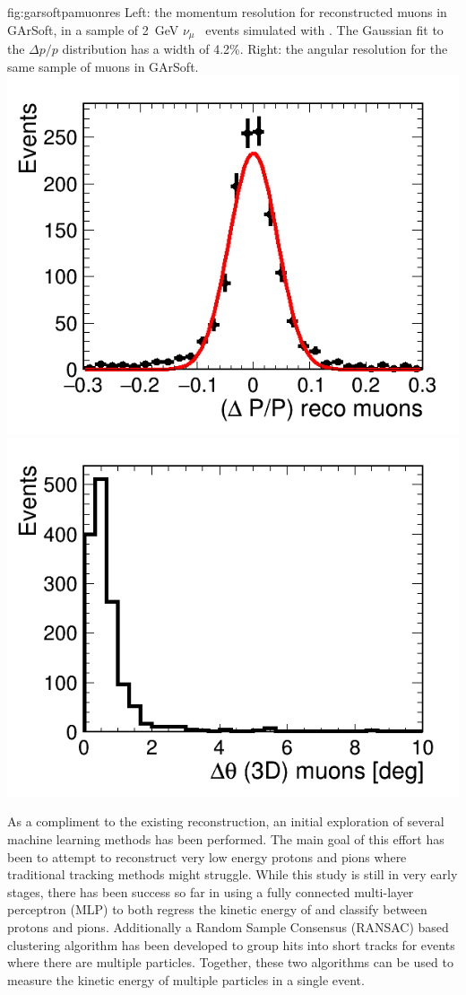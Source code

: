 \begin{dunefigure}{fig:garsoftpamuonres}
{Left: the momentum resolution for reconstructed muons in GArSoft, in a sample of \SI{2}{GeV} $\nu_\mu$~ events simulated with .  The Gaussian fit to the $\Delta p/p$ distribution has a width of 4.2\%. Right:  the \threed angular resolution for the same sample of muons in GArSoft.}
\includegraphics[width=0.49\columnwidth]{graphics/dpmuon.png}\includegraphics[width=0.49\columnwidth]{graphics/anglediffmuon.png} 
\end{dunefigure}

\label{sec:TPC_ML}                                                     

As a compliment to the existing reconstruction, an initial exploration of several machine learning methods has been performed.
The main goal of this effort has been to attempt to reconstruct very low energy protons and pions where traditional           
tracking methods might struggle.   
While this study is still in very early stages, there has been success so far in using a fully connected multi-layer perceptron (MLP) to both regress
the kinetic energy of and classify between protons and pions.  Additionally a Random Sample Consensus (RANSAC) based          
clustering algorithm has been developed to group hits into short tracks for events where there are multiple particles.        
Together, these two algorithms can be used to measure the kinetic energy of multiple particles in a single event.             

